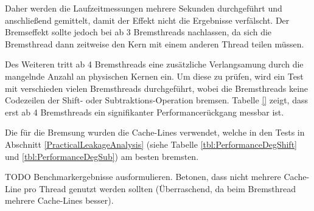 Daher werden die Laufzeitmessungen mehrere Sekunden durchgeführt und anschließend gemittelt, damit der Effekt nicht die Ergebnisse verfälscht.
Der Bremseffekt sollte jedoch bei ab 3 Bremsthreads nachlassen, da sich die Bremsthread dann zeitweise den Kern mit einem anderen Thread teilen müssen.

Des Weiteren tritt ab 4 Bremsthreads eine zusätzliche Verlangsamung durch die mangelnde Anzahl an physischen Kernen ein.
Um diese zu prüfen, wird ein Test mit verschieden vielen Bremsthreads durchgeführt, wobei die Bremsthreads keine Codezeilen der Shift- oder Subtraktions-Operation bremsen.
Tabelle \ref{} zeigt, dass erst ab 4 Bremsthreads ein signifikanter Performancerückgang messbar ist.

%


Die für die Bremsung wurden die Cache-Lines verwendet, welche in den Tests in Abschnitt \ref{PracticalLeakageAnalysis} (siehe Tabelle \ref{tbl:PerformanceDegShift} und \ref{tbl:PerformanceDegSub}) am besten bremsten.

TODO Benchmarkergebnisse ausformulieren. Betonen, dass nicht mehrere Cache-Line pro Thread genutzt werden sollten (Überraschend, da beim Bremsthread mehrere Cache-Lines besser). 










